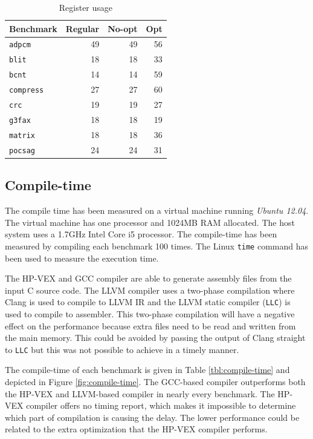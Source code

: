 \begin{table}
  \centering
    \begin{tabular}{|l|r|r|r|}
    \hline
    \textbf{Benchmark} & \multicolumn{1}{|r|}{\textbf{Regular}} & \multicolumn{1}{|r|}{\textbf{No-opt}} & \multicolumn{1}{|r|}{\textbf{Opt}} \\ \hline
	\texttt{adpcm} 		&   49  &	49 & 	56 \\ \hline
	\texttt{blit} 		&   18  &	18 & 	33 \\ \hline
	\texttt{bcnt} 		&   14  &	14 & 	59 \\ \hline
	\texttt{compress} 	&   27  &	27 & 	60 \\ \hline
	\texttt{crc} 		&   19  &	19 & 	27 \\ \hline
	\texttt{g3fax} 		&   18  &	18 & 	19 \\ \hline
	\texttt{matrix} 	&   18 	&	18 & 	36 \\ \hline
	\texttt{pocsag}		&   24  &	24 & 	31 \\ \hline
    \end{tabular}
  \caption{Register usage}
  \label{tbl:gen_regs}
\end{table}

\subsection{Compile-time}
The compile time has been measured on a virtual machine running \emph{Ubuntu 12.04}. The virtual machine has one processor and 1024MB RAM allocated. The host system uses a 1.7GHz Intel Core i5 processor. The compile-time has been measured by compiling each benchmark 100 times. The Linux \texttt{time} command has been used to measure the execution time.

The HP-VEX and GCC compiler are able to generate assembly files from the input C source code. The LLVM compiler uses a two-phase compilation where Clang is used to compile to LLVM IR and the LLVM static compiler (\texttt{LLC}) is used to compile to assembler. This two-phase compilation will have a negative effect on the performance because extra files need to be read and written from the main memory. This could be avoided by passing the output of Clang straight to \texttt{LLC} but this was not possible to achieve in a timely manner.

The compile-time of each benchmark is given in Table \ref{tbl:compile-time} and depicted in Figure \ref{fig:compile-time}. The GCC-based compiler outperforms both the HP-VEX and LLVM-based compiler in nearly every benchmark. The HP-VEX compiler offers no timing report, which makes it impossible to determine which part of compilation is causing the delay. The lower performance could be related to the extra optimization that the HP-VEX compiler performs. 

